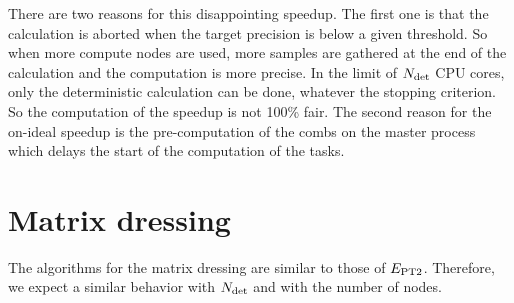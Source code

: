 \documentclass[./thesis.tex]{subfiles}
\begin{document}
There are two reasons for this disappointing speedup. The first one is that the calculation is aborted when the target precision is below a given threshold. So when more compute nodes are used, more samples are gathered at the end of the calculation and the computation is more precise. In the limit of ${N_\text{det}}$ CPU cores, only the deterministic calculation can be done, whatever the stopping criterion. So the computation of the speedup is not 100\% fair.
The second reason for the on-ideal speedup is the pre-computation of the combs on the master process which delays the start of the computation of the tasks.

\clearpage

\section{Matrix dressing}

The algorithms for the matrix dressing are similar to those of $E_\text{PT2}$. Therefore, we expect a similar behavior with ${N_\text{det}}$ and with the number of nodes.
\end{document}
